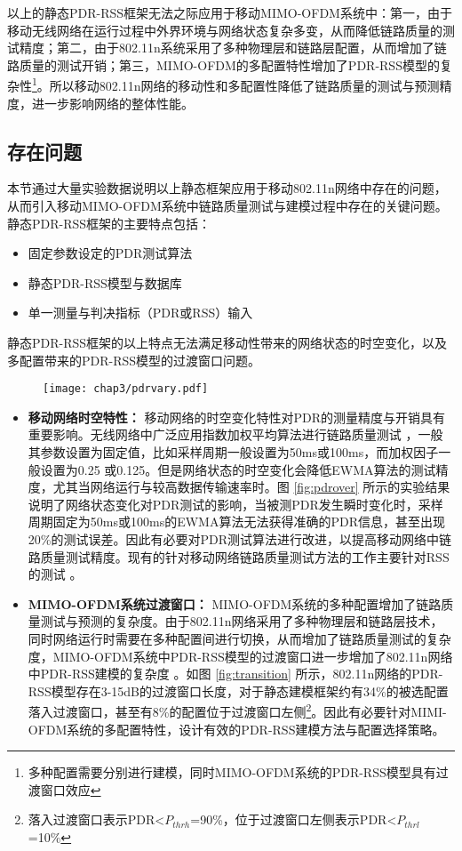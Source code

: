 以上的静态PDR-RSS框架无法之际应用于移动MIMO-OFDM系统中：第一，由于移动无线网络在运行过程中外界环境与网络状态复杂多变，从而降低链路质量的测试精度；第二，由于802.11n系统采用了多种物理层和链路层配置，从而增加了链路质量的测试开销；第三，MIMO-OFDM的多配置特性增加了PDR-RSS模型的复杂性\footnote{多种配置需要分别进行建模，同时MIMO-OFDM系统的PDR-RSS模型具有过渡窗口效应}。所以移动802.11n网络的移动性和多配置性降低了链路质量的测试与预测精度，进一步影响网络的整体性能。

\subsection{存在问题}
\label{sec:prob3}

本节通过大量实验数据说明以上静态框架应用于移动802.11n网络中存在的问题，从而引入移动MIMO-OFDM系统中链路质量测试与建模过程中存在的关键问题。静态PDR-RSS框架的主要特点包括：
\begin{itemize}
  \item 固定参数设定的PDR测试算法
  \item 静态PDR-RSS模型与数据库
  \item 单一测量与判决指标（PDR或RSS）输入
\end{itemize}
静态PDR-RSS框架的以上特点无法满足移动性带来的网络状态的时空变化，以及多配置带来的PDR-RSS模型的过渡窗口问题。

\begin{figure}[!htp]
\centering
    \texttt{[image: chap3/pdrvary.pdf]}
\end{figure}

\begin{itemize}
  \item \textbf{移动网络时空特性：}
  移动网络的时空变化特性对PDR的测量精度与开销具有重要影响。无线网络中广泛应用指数加权平均算法进行链路质量测试 \cite{ath9k} \cite{minstrel} \cite{wong2008wireless}，一般其参数设置为固定值，比如采样周期一般设置为50ms或100ms，而加权因子一般设置为0.25 或0.125。但是网络状态的时空变化会降低EWMA算法的测试精度，尤其当网络运行与较高数据传输速率时。图 \ref{fig:pdrover} 所示的实验结果说明了网络状态变化对PDR测试的影响，当被测PDR发生瞬时变化时，采样周期固定为50ms或100ms的EWMA算法无法获得准确的PDR信息，甚至出现20\%的测试误差。因此有必要对PDR测试算法进行改进，以提高移动网络中链路质量测试精度。现有的针对移动网络链路质量测试方法的工作主要针对RSS的测试 \cite{chen2011ram} \cite{judd2008efficient}。
  \item \textbf{MIMO-OFDM系统过渡窗口：}
  MIMO-OFDM系统的多种配置增加了链路质量测试与预测的复杂度。由于802.11n网络采用了多种物理层和链路层技术，同时网络运行时需要在多种配置间进行切换，从而增加了链路质量测试的复杂度，MIMO-OFDM系统中PDR-RSS模型的过渡窗口进一步增加了802.11n网络中PDR-RSS建模的复杂度 \cite{Halperin2010predictable}。如图 \ref{fig:transition} 所示，802.11n网络的PDR-RSS模型存在3-15dB的过渡窗口长度，对于静态建模框架约有34\%的被选配置落入过渡窗口，甚至有8\%的配置位于过渡窗口左侧\footnote{落入过渡窗口表示PDR<$P_{thrh}$=90\%，位于过渡窗口左侧表示PDR<$P_{thrl}$=10\%}。因此有必要针对MIMI-OFDM系统的多配置特性，设计有效的PDR-RSS建模方法与配置选择策略。
\end{itemize}

